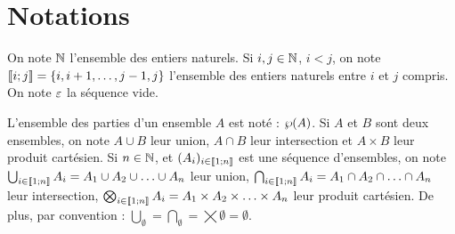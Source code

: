 \section{Notations}

On note $\mathbb{N}$ l'ensemble des entiers naturels.
Si $i, j \in \mathbb{N}$, $i < j$, on note $\llbracket i; j \rrbracket = \{ i, i+1, \ldots, j-1, j \}$
l'ensemble des entiers naturels entre $i$ et $j$ compris.
On note $\varepsilon$ la séquence vide.

L'ensemble des parties d'un ensemble $A$ est noté : $\wp(A)$.
Si $A$ et $B$ sont deux ensembles, on note
$A \cup B$ leur union, $A \cap B$ leur intersection et $A \times B$ leur produit cartésien.
Si $n \in \mathbb{N}$, et $(A_i)_{i \in \llbracket 1; n \rrbracket}$ est une séquence d'ensembles, on note
$\bigcup_{i \in \llbracket 1; n \rrbracket} A_i = A_1 \cup A_2 \cup \ldots \cup A_n$ leur union,
$\bigcap_{i \in \llbracket 1; n \rrbracket} A_i = A_1 \cap A_2 \cap \ldots \cap A_n$ leur intersection,
$\bigotimes_{i \in \llbracket 1; n \rrbracket} A_i = A_1 \times A_2 \times \ldots \times A_n$ leur produit cartésien.
De plus, par convention :
$\bigcup_{\emptyset} = \bigcap_{\emptyset} = \bigtimes{\emptyset} = \emptyset$.


